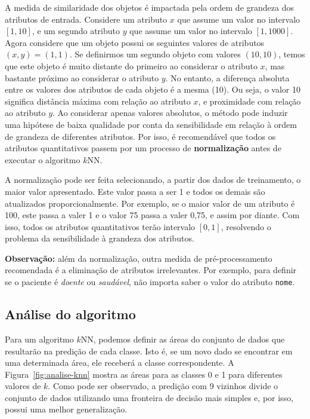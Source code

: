 A medida de similaridade dos objetos é impactada pela ordem de grandeza dos atributos de entrada. Considere um atributo $x$ que assume um valor no intervalo $[1, 10]$, e um segundo atributo $y$ que assume um valor no intervalo $[1, 1000]$. Agora considere que um objeto possui os seguintes valores de atributos $(x, y) = (1, 1)$. Se definirmos um segundo objeto com valores $(10, 10)$, temos que este objeto é muito distante do primeiro ao considerar o atributo $x$, mas bastante próximo ao considerar o atributo $y$. No entanto, a diferença absoluta entre os valores dos atributos de cada objeto é a mesma (10). Ou seja, o valor 10 significa distância máxima com relação ao atributo $x$, e proximidade com relação ao atributo $y$. Ao considerar apenas valores absolutos, o método pode induzir uma hipótese de baixa qualidade por conta da sensibilidade em relação à ordem de grandeza de diferentes atributos. Por isso, é recomendável que todos os atributos quantitativos passem por um processo de \textbf{normalização} antes de executar o algoritmo $k$NN.

A normalização pode ser feita selecionando, a partir dos dados de treinamento, o maior valor apresentado. Este valor passa a ser 1 e todos os demais são atualizados proporcionalmente. Por exemplo, se o maior valor de um atributo é 100, este passa a valer 1 e o valor 75 passa a valer 0,75, e assim por diante. Com isso, todos os atributos quantitativos terão intervalo $[0, 1]$, resolvendo o problema da sensibilidade à grandeza dos atributos.

\textbf{Observação:} além da normalização, outra medida de pré-processamento recomendada é a eliminação de atributos irrelevantes. Por exemplo, para definir se o paciente é \textit{doente} ou \textit{saudável}, não importa saber o valor do atributo \texttt{nome}.

\subsection{Análise do algoritmo}

Para um algoritmo $k$NN, podemos definir as áreas do conjunto de dados que resultarão na predição de cada classe. Isto é, se um novo dado se encontrar em uma determinada área, ele receberá a classe correspondente. A Figura~\ref{fig:analise-knn} mostra as áreas para as classes 0 e 1 para diferentes valores de $k$. Como pode ser observado, a predição com 9 vizinhos divide o conjunto de dados utilizando uma fronteira de decisão mais simples e, por isso, possui uma melhor generalização.

